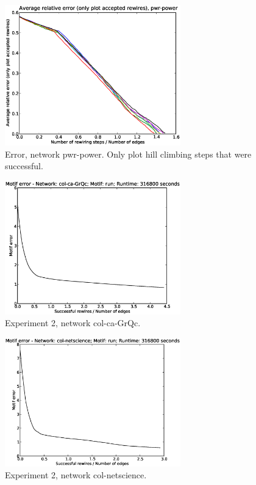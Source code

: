 \begin{figure}[p]
\centering
\includegraphics[width=3in]{Figures/acceptedOnly-pwr-power.eps}
\caption{Error, network pwr-power.  Only plot hill climbing steps that were successful.}
\label{fig:errors-pwr-power}
\end{figure}

\begin{figure}[p]
\centering
\includegraphics[width=3in]{Figures/motif_error-col-ca-GrQc-run.eps}
\caption{Experiment 2, network col-ca-GrQc.}
\label{fig:exp2-col-ca-GrQc-run}
\end{figure}

\begin{figure}[p]
\centering
\includegraphics[width=3in]{Figures/motif_error-col-netscience-run.eps}
\caption{Experiment 2, network col-netscience.}
\label{fig:exp2-col-netscience-run}
\end{figure}


